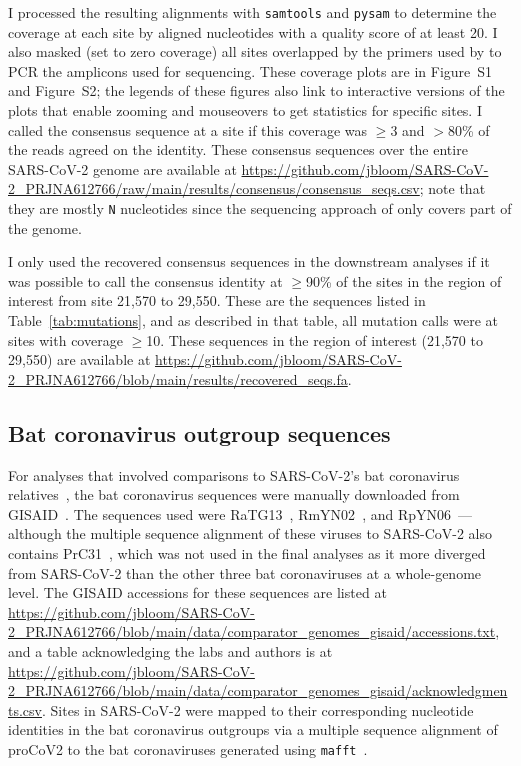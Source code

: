 \documentclass[9pt,twocolumn,twoside]{gsajnl_modified}
\begin{document}
{I processed the resulting alignments with \texttt{samtools} and \texttt{pysam} to determine the coverage at each site by aligned nucleotides with a quality score of at least 20.
I also masked (set to zero coverage) all sites overlapped by the primers used by \citet{wang2020medRxiv} to PCR the amplicons used for sequencing.
These coverage plots are in Figure~S1 and Figure~S2; the legends of these figures also link to interactive versions of the plots that enable zooming and mouseovers to get statistics for specific sites.
I called the consensus sequence at a site if this coverage was $\ge$3 and $>$80\% of the reads agreed on the identity.
These consensus sequences over the entire SARS-CoV-2 genome are available at \url{https://github.com/jbloom/SARS-CoV-2_PRJNA612766/raw/main/results/consensus/consensus_seqs.csv}; note that they are mostly \texttt{N} nucleotides since the sequencing approach of \citet{wang2020medRxiv} only covers part of the genome.

I only used the recovered consensus sequences in the downstream analyses if it was possible to call the consensus identity at $\ge$90\% of the sites in the region of interest from site 21,570 to 29,550.
These are the sequences listed in Table~\ref{tab:mutations}, and as described in that table, all mutation calls were at sites with coverage $\ge$10.
These sequences in the region of interest (21,570 to 29,550) are available at \url{https://github.com/jbloom/SARS-CoV-2_PRJNA612766/blob/main/results/recovered_seqs.fa}.

\subsection{Bat coronavirus outgroup sequences}
For analyses that involved comparisons to SARS-CoV-2's bat coronavirus relatives~\citep{lytras2021exploring}, the bat coronavirus sequences were manually downloaded from GISAID~\citep{shu2017gisaid}.
The sequences used were RaTG13~\citep{zhou2020pneumonia}, RmYN02~\citep{zhou2020novel}, and RpYN06~\citep{zhou2021identification}---although the multiple sequence alignment of these viruses to SARS-CoV-2 also contains PrC31~\citep{li2021novel}, which was not used in the final analyses as it more diverged from SARS-CoV-2 than the other three bat coronaviruses at a whole-genome level.
The GISAID accessions for these sequences are listed at \url{https://github.com/jbloom/SARS-CoV-2_PRJNA612766/blob/main/data/comparator_genomes_gisaid/accessions.txt}, and a table acknowledging the labs and authors is at \url{https://github.com/jbloom/SARS-CoV-2_PRJNA612766/blob/main/data/comparator_genomes_gisaid/acknowledgments.csv}.
Sites in SARS-CoV-2 were mapped to their corresponding nucleotide identities in the bat coronavirus outgroups via a multiple sequence alignment of proCoV2 to the bat coronaviruses generated using \texttt{mafft}~\citep{katoh2013mafft}.

}
\end{document}
